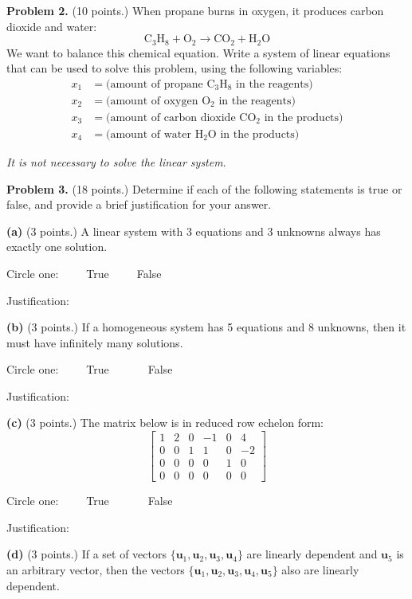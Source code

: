 \documentclass[12pt]{article}
\begin{document}
\textbf{Problem 2.} (10 points.)
When propane burns in oxygen, it produces carbon dioxide and water:
\[
\text{C}_3\text{H}_8 + \text{O}_2 \longrightarrow \text{C}\text{O}_2+\text{H}_2\text{O}
\]
We want to balance this chemical equation. Write a system of linear equations that can be used to solve this problem, using the following variables:
\begin{align*}
x_1 &= \text{(amount of propane $\text{C}_3\text{H}_8$ in the reagents)}\\
x_2 &= \text{(amount of oxygen $\text{O}_2$ in the reagents})\\
x_3 &= \text{(amount of carbon dioxide $\text{C}\text{O}_2$ in the products)}\\
x_4 &= \text{(amount of water $\text{H}_2\text{O}$ in the products)}
\end{align*}

\emph{It is not necessary to solve the linear system}.

\clearpage

\textbf{Problem 3.} (18 points.) Determine if each of the following statements is true or false, and provide a brief justification for your answer.

\textbf{(a)} (3 points.) A linear system with 3 equations and 3 unknowns always has exactly one solution.

Circle one:\ \ \ \ \  True\ \ \ \ \ False

Justification:
\vskip1.5in

\textbf{(b)} (3 points.) If a homogeneous system has 5 equations and 8 unknowns, then it must have infinitely many solutions.

Circle one:\ \ \ \ \  True\ \ \ \ \ \ \ False

Justification:
\vskip1.5in

\textbf{(c)} (3 points.) The matrix below is in reduced row echelon form:
\[
\left[
\begin{matrix}
1 & 2 & 0 & -1 & 0 & 4\\
0 & 0 & 1 &  1 & 0 & -2\\
0 & 0 & 0 & 0 & 1 & 0 \\
0 & 0 & 0 & 0 & 0 & 0
\end{matrix}
\right]
\]

Circle one:\ \ \ \ \  True\ \ \ \ \ \ \ False

Justification:
\clearpage

\textbf{(d)} (3 points.) If a set of vectors $\{\mathbf{u}_1,\mathbf{u}_2,\mathbf{u}_3,\mathbf{u}_4\}$ are linearly dependent and $\mathbf{u}_5$ is an arbitrary vector, then the vectors  $\{\mathbf{u}_1,\mathbf{u}_2,\mathbf{u}_3,\mathbf{u}_4,\mathbf{u}_5\}$ also are linearly dependent.
\end{document}
